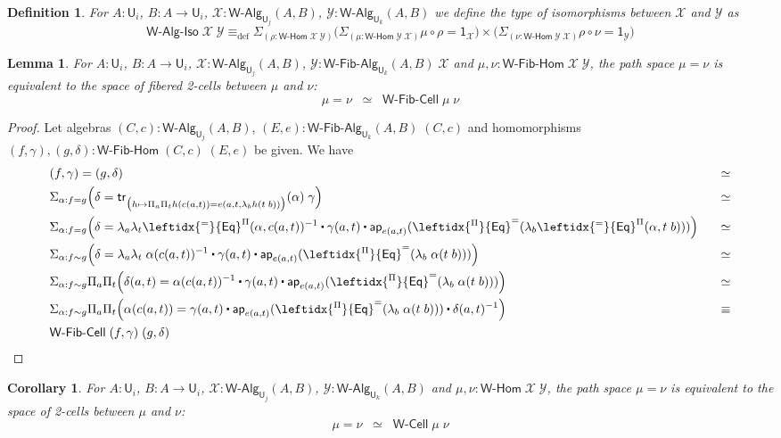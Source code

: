 \documentclass[reqno,10pt,a4paper,oneside]{amsart}
\numberwithin{equation}{section}
\theoremstyle{mythm}
\newtheorem{lemma}[theorem]{Lemma}
\newtheorem{corollary}[theorem]{Corollary}
\theoremstyle{mydef}
\newtheorem{definition}[theorem]{Definition}
\theoremstyle{myrmk}
\newcommand{\deq}{\equiv}
\newcommand{\defeq}{\deq_{\mathrm{def}}}
\newcommand{\comp}{\circ}
\newcommand{\trans}{\mathsf{tr}}
\newcommand{\ct}{%
  \mathchoice{\mathbin{\raisebox{0.5ex}{$\displaystyle\centerdot$}}}%
             {\mathbin{\raisebox{0.5ex}{$\centerdot$}}}%
             {\mathbin{\raisebox{0.25ex}{$\scriptstyle\,\centerdot\,$}}}%
             {\mathbin{\raisebox{0.1ex}{$\scriptscriptstyle\,\centerdot\,$}}}}
\newcommand{\funext}{\leftidx{^\Pi}{\mathsf{Eq}}^{=}}
\newcommand{\happly}{\leftidx{^=}{\mathsf{Eq}}^{\Pi}}
\newcommand{\prd}[1]{\Pi_{#1}}
\newcommand{\sm}[1]{\Sigma_{#1}}
\newcommand{\lam}[1]{\lambda_{#1}}
\newcommand{\app}{\mathsf{ap}}
\newcommand{\one}{\mathsf{1}}
\newcommand{\UU}{\mathsf{U}}
\newcommand{\WCell}{\mathsf{W}\text{-}\mathsf{Cell}}
\newcommand{\WFibCell}{\mathsf{W}\text{-}\mathsf{Fib}\text{-}\mathsf{Cell}}
\newcommand{\WAlg}{\mathsf{W}\text{-}\mathsf{Alg}}
\newcommand{\WFibAlg}{\mathsf{W}\text{-}\mathsf{Fib}\text{-}\mathsf{Alg}}
\newcommand{\WHom}{\mathsf{W}\text{-}\mathsf{Hom}}
\newcommand{\WFibHom}{\mathsf{W}\text{-}\mathsf{Fib}\text{-}\mathsf{Hom}}
\newcommand{\WAlgIso}{\mathsf{W}\text{-}\mathsf{Alg}\text{-}\mathsf{Iso}}
\newcommand{\X}{\mathcal{X}}
\newcommand{\Y}{\mathcal{Y}}
\begin{document}
\begin{definition}
For $A:\UU_i$, $B : A \to \UU_i$, $\X : \WAlg_{\UU_j}(A,B)$, $\Y : \WAlg_{\UU_k}(A,B)$ we define the type of \emph{isomorphisms} between $\X$ and $\Y$ as
\[\WAlgIso \; \X \; \Y \defeq \sm{(\rho : \WHom \; \X \; \Y)} \Big(\sm{(\mu : \WHom \; \Y \; \X)} \mu \comp \rho = \one_\X \Big) \times \Big(\sm{(\nu : \WHom \; \Y \; \X)} \rho \comp \nu = \one_\Y \Big) \] 
\end{definition}

\begin{lemma}\label{WFibHomSpace}
For $A:\UU_i$, $B : A \to \UU_i$, $\X : \WAlg_{\UU_j}(A,B)$, $\Y : \WFibAlg_{\UU_k}(A,B) \; \X$ and $\mu,\nu : \WFibHom \; \X \; \Y$, the path space $\mu = \nu$ is equivalent to the space of fibered 2-cells between $\mu$ and $\nu$:
\[ \mu = \nu \;\; \simeq \;\; \WFibCell \; \mu \; \nu \] 
\end{lemma}
\begin{proof}
Let algebras $(C,c) : \WAlg_{\UU_j}(A,B)$, $(E,e) : \WFibAlg_{\UU_k}(A,B) \; (C,c)$ and homomorphisms $(f,\gamma), (g,\delta) : \WFibHom \; (C,c) \; (E,e)$ be given. We have
\begin{alignat*}{4}
& (f,\gamma) = (g,\delta) & \simeq \\
& \sm{\alpha : f = g} \Big(\delta = \trans_{\big(h \mapsto \prd{a}\prd{t} h(c(a,t)) = e(a,t,\lam{b} h(t\;b))\big)}(\alpha) \; \gamma\Big) & \simeq \\
& \sm{\alpha : f = g} \Big(\delta = \lam{a} \lam{t} \happly(\alpha,c(a,t))^{-1} \ct \gamma(a,t) \ct \app_{e(a,t)}(\funext (\lam{b}\happly(\alpha,t \; b))) \Big) & \;\;\; \simeq \\
& \sm{\alpha : f \sim g} \Big(\delta = \lam{a} \lam{t} \; \alpha(c(a,t))^{-1} \ct \gamma(a,t) \ct \app_{e(a,t)}(\funext (\lam{b}\; \alpha(t \; b))) \Big) & \simeq \\
& \sm{\alpha : f \sim g} \prd{a}\prd{t}\Big(\delta(a,t) = \alpha(c(a,t))^{-1} \ct \gamma(a,t) \ct \app_{e(a,t)}(\funext (\lam{b}\; \alpha(t \; b))) \Big) & \simeq \\ 
& \sm{\alpha : f \sim g} \prd{a}\prd{t}\Big(\alpha(c(a,t)) = \gamma(a,t) \ct \app_{e(a,t)}(\funext (\lam{b}\; \alpha(t \; b))) \ct \delta(a,t)^{-1} \Big) & \equiv \\ 
& \WFibCell \; (f,\gamma) \; (g,\delta)
\end{alignat*}
\end{proof}

\begin{corollary}\label{WHomSpace}
For $A:\UU_i$, $B : A \to \UU_i$, $\X : \WAlg_{\UU_j}(A,B)$, $\Y : \WAlg_{\UU_k}(A,B)$ and $\mu,\nu : \WHom \; \X \; \Y$, the path space $\mu = \nu$ is equivalent to the space of 2-cells between $\mu$ and $\nu$:
\[ \mu = \nu \;\; \simeq \;\; \WCell \; \mu \; \nu \] 
\end{corollary}
\end{document}
